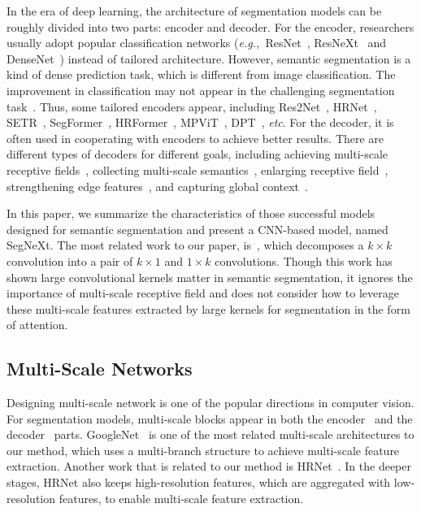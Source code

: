 \documentclass{article}
\def\eg{\emph{e.g.,~}}
\def\etc{{\em etc}}
\begin{document}
In the era of deep learning, the architecture of segmentation models
can be roughly divided into two parts: encoder and decoder. 
For the encoder, researchers usually adopt popular classification networks
(\eg{ResNet~\cite{he2016deep}, ResNeXt~\cite{xie2017aggregated} 
and DenseNet~\cite{huang2017densely}}) instead of tailored architecture.
However, semantic segmentation is a kind of dense prediction task, 
which is different from image classification.
The improvement in classification may not appear in the challenging segmentation task~\cite{he2019bag}.
Thus, some tailored encoders appear, including 
Res2Net~\cite{pami21Res2net},
HRNet~\cite{wang2020deep}, SETR~\cite{zheng2021rethinking}, 
SegFormer~\cite{xie2021segformer}, HRFormer~\cite{yuan2021hrformer}, MPViT~\cite{lee2022mpvit}, DPT~\cite{ranftl2021vision}, \etc.
For the decoder, it is often used in cooperating with 
encoders to achieve better results.
There are different types of decoders for different goals,
including achieving multi-scale receptive fields~\cite{zhao2017pyramid,chen2016attention,xia2016zoom}, 
collecting multi-scale semantics~\cite{ronneberger2015u,xie2021segformer,chen2018encoder},
enlarging receptive field~\cite{chen2017deeplab,chen2014semantic,peng2017large}, 
strengthening edge features~\cite{zhen2020joint,bertasius2016semantic,ding2019boundary,li2020improving,yuan2020segfix}, and capturing global context~\cite{fu2019dual,huang2019ccnet,yuan2018ocnet,li2019expectation,guo2021beyond,he2019adaptive,zhang2018context}.


{In this paper, we summarize the characteristics of those successful models 
designed for semantic segmentation and present a CNN-based model, named SegNeXt.}
The most related work to our paper, is~\cite{peng2017large},
which decomposes a $k \times k$ convolution into a pair of $k\times1$ and 
$1\times k$ convolutions.
Though this work has shown large convolutional kernels matter in semantic segmentation, it ignores the importance of multi-scale receptive field
and does not consider how to leverage these multi-scale features extracted by large
kernels for segmentation in the form of attention.





\subsection{Multi-Scale Networks}

Designing multi-scale network is one of the popular directions in computer vision.
For segmentation models, multi-scale blocks appear in both the 
encoder~\cite{wang2020deep,pami21Res2net,szegedy2015going} and the 
decoder~\cite{zhao2017pyramid,yu2015multi,chen2017rethinking} parts.
GoogleNet~\cite{szegedy2015going} is one of the most related
multi-scale architectures to our method, which uses a multi-branch structure to
achieve multi-scale feature extraction.
Another work that is related to our method is HRNet~\cite{wang2020deep}.
In the deeper stages, HRNet also keeps high-resolution features, which are
aggregated with low-resolution features, to enable multi-scale feature extraction.
\end{document}
